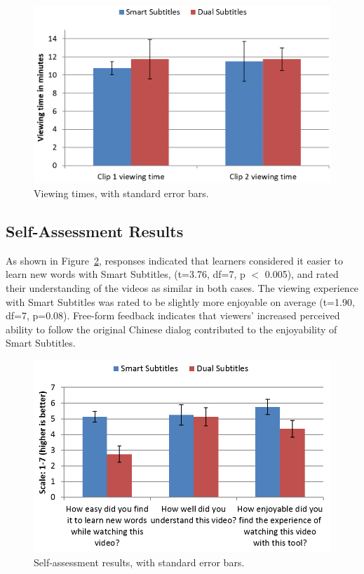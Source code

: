 \documentclass{sigchi}
\begin{document}
\begin{figure}[!h]
\centering
\includegraphics[width=\columnwidth]{viewing-times}
\caption{Viewing times, with standard error bars.}
\label{fig:figure7}
\end{figure}

\subsection{Self-Assessment Results}

As shown in Figure~\ref{fig:figure8}, responses indicated that learners considered it easier to learn new words with Smart Subtitles, (t=3.76, df=7, p $<$ 0.005), and rated their understanding of the videos as similar in both cases. The viewing experience with Smart Subtitles was rated to be slightly more enjoyable on average (t=1.90, df=7, p=0.08). Free-form feedback indicates that viewers' increased perceived ability to follow the original Chinese dialog contributed to the enjoyability of Smart Subtitles.

\begin{figure}[!h]
\centering
\includegraphics[width=\columnwidth]{self-assessment-results}
\caption{Self-assessment results, with standard error bars.}
\label{fig:figure8}
\end{figure}
\end{document}
